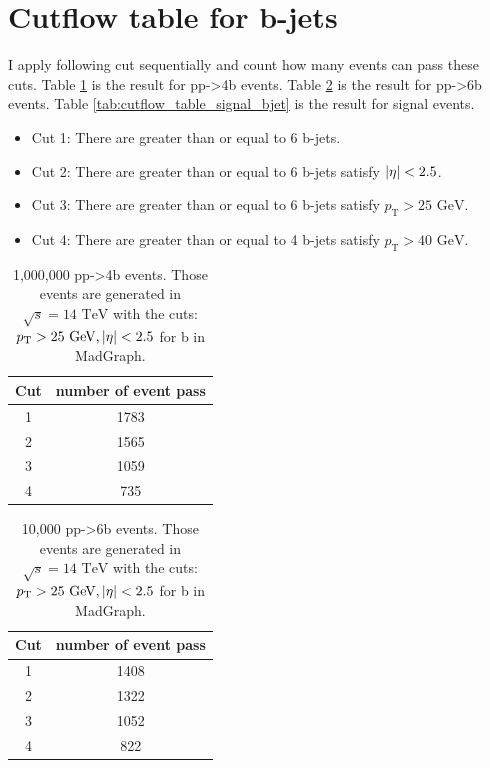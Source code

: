 \documentclass[12pt]{article}
\begin{document}
\section{Cutflow table for b-jets}%
\label{sec:cutflow_table_for_b_jets}
	I apply following cut sequentially and count how many events can pass these cuts. Table \ref{tab:cutflow_table_pp4b_bjet} is the result for pp->4b events. Table \ref{tab:cutflow_table_pp6b_bjet} is the result for pp->6b events. Table \ref{tab:cutflow_table_signal_bjet} is the result for signal events.

	\begin{itemize}
		\item Cut 1: There are greater than or equal to 6 b-jets.
		\item Cut 2: There are greater than or equal to 6 b-jets satisfy $\abs{\eta}<2.5$.
		\item Cut 3: There are greater than or equal to 6 b-jets satisfy $p_\text{T}>\text{25 GeV}$.
		\item Cut 4: There are greater than or equal to 4 b-jets satisfy $p_\text{T}>\text{40 GeV}$.
	\end{itemize}

	\begin{table}[htpb]
		\centering
		\caption{1,000,000 pp->4b events. Those events are generated in $\sqrt{s} = 14 \text{ TeV}$ with the cuts: $p_\text{T} >\text{25 GeV}, \abs{\eta}<2.5$ for b in MadGraph.
}
		\label{tab:cutflow_table_pp4b_bjet}
		\begin{tabular}{cc}
			Cut & number of event pass \\
			\hline
			1 & 1783 \\
			2 & 1565 \\
			3 & 1059 \\
			4 & 735 
		\end{tabular}	
	\end{table}

	\begin{table}[htpb]
		\centering
		\caption{10,000 pp->6b events. Those events are generated in $\sqrt{s} = 14 \text{ TeV}$ with the cuts: $p_\text{T} >\text{25 GeV}, \abs{\eta}<2.5$ for b in MadGraph.
}
		\label{tab:cutflow_table_pp6b_bjet}
		\begin{tabular}{cc}
			Cut & number of event pass \\
			\hline
			1 & 1408 \\
			2 & 1322 \\
			3 & 1052 \\
			4 & 822 
		\end{tabular}	
	\end{table}
\end{document}

